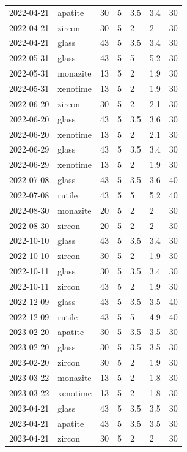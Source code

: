 \begin{longtable}{p{} p{} p{} p{} p{} p{} p{}}
  2022-04-21 & apatite & 30 & 5 & 3.5 & 3.4  & 30 \\
  2022-04-21 & zircon & 30 & 5 & 2 & 2  & 30 \\
  2022-04-21 & glass & 43 & 5 & 3.5 & 3.4  & 30 \\
  2022-05-31 & glass & 43 & 5 & 5 & 5.2  & 30 \\
  2022-05-31 & monazite & 13 & 5 & 2 & 1.9  & 30 \\
  2022-05-31 & xenotime & 13 & 5 & 2 & 1.9  & 30 \\
  2022-06-20 & zircon & 30 & 5 & 2 & 2.1  & 30 \\
  2022-06-20 & glass & 43 & 5 & 3.5 & 3.6  & 30 \\
  2022-06-20 & xenotime & 13 & 5 & 2 & 2.1  & 30 \\
  2022-06-29 & glass & 43 & 5 & 3.5 & 3.4  & 30 \\
  2022-06-29 & xenotime & 13 & 5 & 2 & 1.9  & 30 \\
  2022-07-08 & glass & 43 & 5 & 3.5 & 3.6  & 40 \\
  2022-07-08 & rutile & 43 & 5 & 5 & 5.2  & 40 \\
  2022-08-30 & monazite & 20 & 5 & 2 & 2  & 30 \\
  2022-08-30 & zircon & 20 & 5 & 2 & 2  & 30 \\
  2022-10-10 & glass & 43 & 5 & 3.5 & 3.4  & 30 \\
  2022-10-10 & zircon & 30 & 5 & 2 & 1.9  & 30 \\
  2022-10-11 & glass & 30 & 5 & 3.5&  3.4  & 30 \\
  2022-10-11 & zircon & 43 & 5 & 2 & 1.9  & 30 \\
  2022-12-09 & glass & 43 & 5 & 3.5 & 3.5  & 40 \\
  2022-12-09 & rutile & 43 & 5 & 5 & 4.9  & 40 \\
  2023-02-20 & apatite & 30 & 5 & 3.5 & 3.5  & 30 \\
  2023-02-20 & glass & 30 & 5 & 3.5 & 3.5  & 30 \\
  2023-02-20 & zircon & 30 & 5 & 2 & 1.9  & 30 \\
  2023-03-22 & monazite & 13 & 5 & 2 & 1.8  & 30 \\
  2023-03-22 & xenotime & 13 & 5 & 2 & 1.8  & 30 \\
  2023-04-21 & glass & 43 & 5 & 3.5 & 3.5  & 30 \\
  2023-04-21 & apatite & 43 & 5 & 3.5 & 3.5  & 30 \\
  2023-04-21 & zircon & 30 & 5 & 2 & 2  & 30 \\

\end{longtable}
